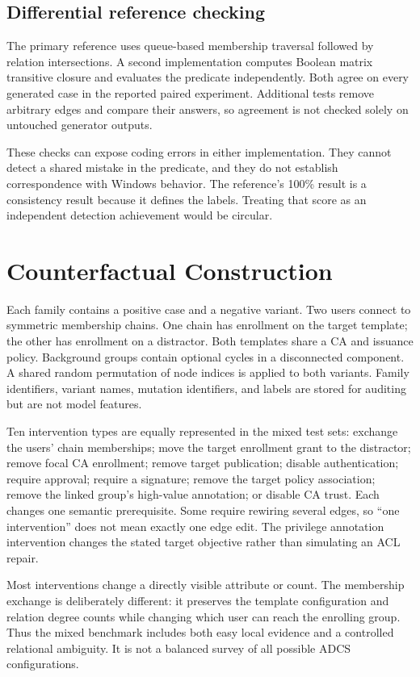 \documentclass[journal]{IEEEtran}
\begin{document}
\subsection{Differential reference checking}
The primary reference uses queue-based membership traversal followed by relation intersections. A second implementation computes Boolean matrix transitive closure and evaluates the predicate independently. Both agree on every generated case in the reported paired experiment. Additional tests remove arbitrary edges and compare their answers, so agreement is not checked solely on untouched generator outputs.

These checks can expose coding errors in either implementation. They cannot detect a shared mistake in the predicate, and they do not establish correspondence with Windows behavior. The reference's 100\% result is a consistency result because it defines the labels. Treating that score as an independent detection achievement would be circular.

\section{Counterfactual Construction}
Each family contains a positive case and a negative variant. Two users connect to symmetric membership chains. One chain has enrollment on the target template; the other has enrollment on a distractor. Both templates share a CA and issuance policy. Background groups contain optional cycles in a disconnected component. A shared random permutation of node indices is applied to both variants. Family identifiers, variant names, mutation identifiers, and labels are stored for auditing but are not model features.

Ten intervention types are equally represented in the mixed test sets: exchange the users' chain memberships; move the target enrollment grant to the distractor; remove focal CA enrollment; remove target publication; disable authentication; require approval; require a signature; remove the target policy association; remove the linked group's high-value annotation; or disable CA trust. Each changes one semantic prerequisite. Some require rewiring several edges, so ``one intervention'' does not mean exactly one edge edit. The privilege annotation intervention changes the stated target objective rather than simulating an ACL repair.

Most interventions change a directly visible attribute or count. The membership exchange is deliberately different: it preserves the template configuration and relation degree counts while changing which user can reach the enrolling group. Thus the mixed benchmark includes both easy local evidence and a controlled relational ambiguity. It is not a balanced survey of all possible ADCS configurations.
\end{document}
